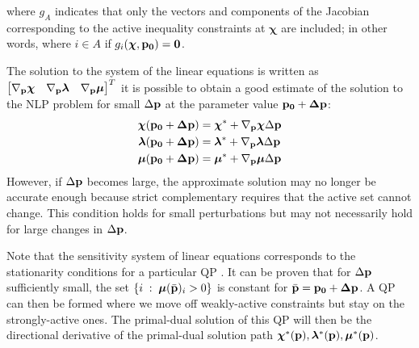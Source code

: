 where $g_A$ indicates that only the vectors and components of the Jacobian corresponding to the active inequality constraints at $\boldsymbol{\chi}$ are included; in other words, where $i\in A$ if $g_i(\boldsymbol{\chi},\bf{p}_0)=0$.
\par
The solution to the system of the linear equations is written as $\begin{bmatrix}\nabla_{\bf{p}}\boldsymbol{\chi}&\nabla_{\bf{p}}\boldsymbol{\lambda}&\nabla_{\bf{p}}\boldsymbol{\mu}\end{bmatrix}^T$ it is possible to obtain a good estimate of the solution to the NLP problem for small $\Delta\bf{p}$ at the parameter value $\bf{p}_0+\Delta\bf{p}$:
	\begin{align}
		\boldsymbol{\chi}(\bf{p}_0+\Delta\bf{p})&=\boldsymbol{\chi}^*+\nabla_{\bf{p}}\boldsymbol{\chi}\Delta\bf{p}\\
		\boldsymbol{\lambda}(\bf{p}_0+\Delta\bf{p})&=\boldsymbol{\lambda}^*+\nabla_{\bf{p}}\boldsymbol{\lambda}\Delta\bf{p}\\
		\boldsymbol{\mu}(\bf{p}_0+\Delta\bf{p})&=\boldsymbol{\mu}^*+\nabla_{\bf{p}}\boldsymbol{\mu}\Delta\bf{p}
	\end{align}
However,  if $\Delta\bf{p}$ becomes large, the approximate solution may no longer be accurate enough because strict complementary requires that the active set cannot change.
This condition holds for small perturbations but may not necessarily hold for large changes in $\Delta\bf{p}$.
\par
Note that the sensitivity system of linear equations corresponds to the stationarity conditions for a particular QP \cite{economic}.
It can be proven that for $\Delta\bf{p}$ sufficiently small, the set $\{i\;:\;\boldsymbol{\mu}(\bar{\bf{p}})_i>0\}$ is constant for $\bar{\bf{p}}=\bf{p}_0+\Delta\bf{p}$.
A QP can then be formed where we move off weakly-active constraints but stay on the strongly-active ones.
The primal-dual solution of this QP will then be the directional derivative of the primal-dual solution path $\boldsymbol{\chi}^*(\bf{p}),\boldsymbol{\lambda}^*(\bf{p}),\boldsymbol{\mu}^*(\bf{p})$.

